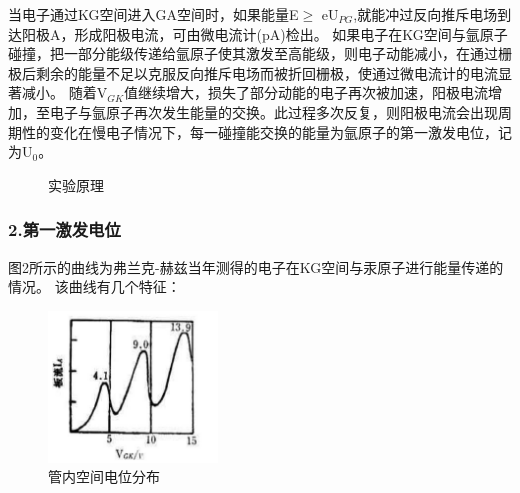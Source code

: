 \documentclass[12pt,a4paper,UTF8]{ctexart}
\begin{document}
当电子通过KG空间进入GA空间时，如果能量E$\geqslant$ eU$_{PG}$,就能冲过反向推斥电场到达阳极A，形成阳极电流，可由微电流计(pA)检出。
如果电子在KG空间与氩原子碰撞，把一部分能级传递给氩原子使其激发至高能级，则电子动能减小，在通过栅极后剩余的能量不足以克服反向推斥电场而被折回栅极，使通过微电流计的电流显著减小。
随着V$_{GK}$值继续增大，损失了部分动能的电子再次被加速，阳极电流增加，至电子与氩原子再次发生能量的交换。此过程多次反复，则阳极电流会出现周期性的变化在慢电子情况下，每一碰撞能交换的能量为氩原子的第一激发电位，记为U$_0$。
	\begin{figure}[htbp]
		\centering
		\caption{实验原理}
		\label{fig:tcvi}
	\end{figure}

	\subsubsection*{2.第一激发电位}
	
	图2所示的曲线为弗兰克-赫兹当年测得的电子在KG空间与汞原子进行能量传递的情况。
	该曲线有几个特征：

	\begin{figure}[htbp]
		\centering
		\includegraphics[width=0.4\textwidth]{img//3.jpg}
		\caption{管内空间电位分布}
	\end{figure}
\end{document}
